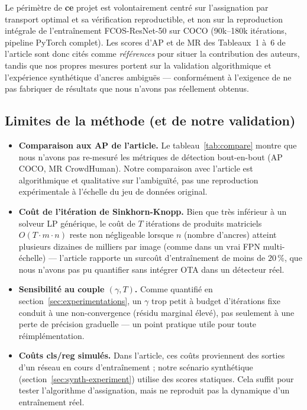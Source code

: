 \documentclass[11pt,a4paper]{article}
\begin{document}
Le périmètre de \textbf{ce} projet est volontairement centré sur l'assignation par transport optimal et sa vérification reproductible, et non sur la reproduction intégrale de l'entraînement FCOS-ResNet-50 sur COCO (90k--180k itérations, pipeline PyTorch complet). Les scores d'AP et de MR des Tableaux~1 à~6 de l'article sont donc cités comme \emph{références} pour situer la contribution des auteurs, tandis que nos propres mesures portent sur la validation algorithmique et l'expérience synthétique d'ancres ambiguës --- conformément à l'exigence de ne pas fabriquer de résultats que nous n'avons pas réellement obtenus.

\subsection{Limites de la méthode (et de notre validation)}
\begin{itemize}
  \item \textbf{Comparaison aux AP de l'article.} Le tableau~\ref{tab:compare} montre que nous n'avons pas re-mesuré les métriques de détection bout-en-bout (AP COCO, MR CrowdHuman). Notre comparaison avec l'article est algorithmique et qualitative sur l'ambiguïté, pas une reproduction expérimentale à l'échelle du jeu de données original.
  \item \textbf{Coût de l'itération de Sinkhorn-Knopp.} Bien que très inférieur à un solveur LP générique, le coût de $T$ itérations de produits matriciels $O(T\cdot m\cdot n)$ reste non négligeable lorsque $n$ (nombre d'ancres) atteint plusieurs dizaines de milliers par image (comme dans un vrai FPN multi-échelle) --- l'article rapporte un surcoût d'entraînement de moins de $20\,\%$, que nous n'avons pas pu quantifier sans intégrer OTA dans un détecteur réel.
  \item \textbf{Sensibilité au couple $(\gamma, T)$.} Comme quantifié en section~\ref{sec:experimentations}, un $\gamma$ trop petit à budget d'itérations fixe conduit à une non-convergence (résidu marginal élevé), pas seulement à une perte de précision graduelle --- un point pratique utile pour toute réimplémentation.
  \item \textbf{Coûts cls/reg simulés.} Dans l'article, ces coûts proviennent des sorties d'un réseau en cours d'entraînement ; notre scénario synthétique (section~\ref{sec:synth-experiment}) utilise des scores statiques. Cela suffit pour tester l'algorithme d'assignation, mais ne reproduit pas la dynamique d'un entraînement réel.
\end{itemize}
\end{document}
